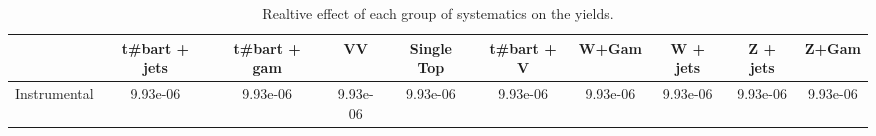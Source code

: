 \begin{table}[htbp]
\begin{center}
\begin{tabular}{|c|c|c|c|c|c|c|c|c|c|}
\hline 
      & t#bar{t} + jets      & t#bar{t} +  gam      & VV      & Single Top      & t#bar{t} + V      & W+Gam      & W + jets      & Z + jets      & Z+Gam \\ 
\hline 
 Instrumental & 9.93e-06 & 9.93e-06 & 9.93e-06 & 9.93e-06 & 9.93e-06 & 9.93e-06 & 9.93e-06 & 9.93e-06 & 9.93e-06 \\ 
\hline 
\end{tabular} 
\caption{Realtive effect of each group of systematics on the yields.} 
\end{center} 
\end{table} 
